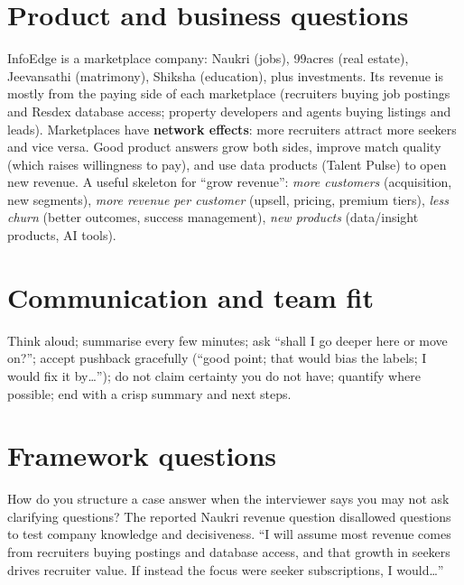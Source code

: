 \section{Product and business questions}
InfoEdge is a marketplace company: Naukri (jobs), 99acres (real estate), Jeevansathi (matrimony), Shiksha (education), plus investments. Its revenue is mostly from the
paying side of each marketplace (recruiters buying job postings and Resdex database access; property developers and agents buying listings and leads). Marketplaces have
\textbf{network effects}: more recruiters attract more seekers and vice versa. Good product answers grow both sides, improve match quality (which raises willingness to pay),
and use data products (Talent Pulse) to open new revenue. A useful skeleton for ``grow revenue'': \emph{more customers} (acquisition, new segments), \emph{more revenue per
customer} (upsell, pricing, premium tiers), \emph{less churn} (better outcomes, success management), \emph{new products} (data/insight products, AI tools).

\section{Communication and team fit}
Think aloud; summarise every few minutes; ask ``shall I go deeper here or move on?''; accept pushback gracefully (``good point; that would bias the labels; I would
fix it by\dots''); do not claim certainty you do not have; quantify where possible; end with a crisp summary and next steps.

\section{Framework questions}

\begin{qa}{ How do you structure a case answer when the interviewer says you may not ask clarifying questions?}
\why The reported Naukri revenue question disallowed questions to test company knowledge and decisiveness. ``I will assume most revenue comes from recruiters buying
postings and database access, and that growth in seekers drives recruiter value. If instead the focus were seeker subscriptions, I would\dots''
\end{qa}

